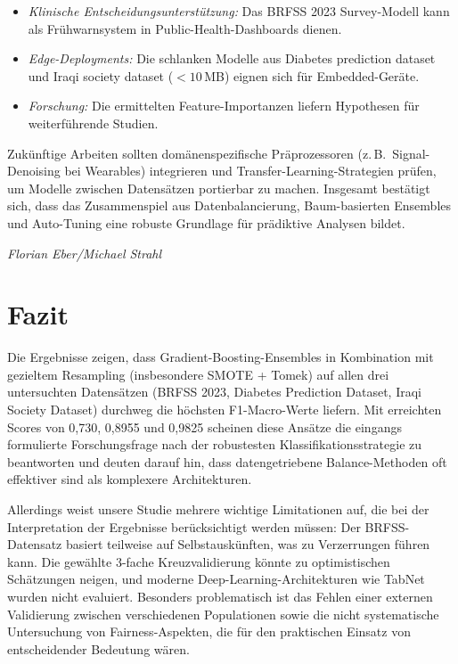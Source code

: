 \documentclass[10pt]{scrartcl}
\begin{document}
\begin{itemize}
  \item \emph{Klinische Entscheidungs­unterstützung:} Das BRFSS 2023 Survey-Modell kann als Frühwarnsystem in Public-Health-Dashboards dienen.
  \item \emph{Edge-Deployments:} Die schlanken Modelle aus Diabetes prediction dataset und Iraqi society dataset (\(<10\)\,MB) eignen sich für Embedded-Geräte.
  \item \emph{Forschung:} Die ermittelten Feature-Importanzen liefern Hypothesen für weiterführende Studien.
\end{itemize}

Zukünftige Arbeiten sollten domänenspezifische Präprozessoren (z.\,B.\ Signal-Denoising bei Wearables) integrieren und Transfer-Learning-Strategien prüfen, um Modelle zwischen Datensätzen portierbar zu machen. Insgesamt bestätigt sich, dass das Zusammenspiel aus Daten­balancierung, Baum-basierten Ensembles und Auto-Tuning eine robuste Grundlage für prädiktive Analysen bildet.

\begin{flushright}
  \footnotesize\textit{Florian Eber/Michael Strahl}
\end{flushright}





\section{Fazit}
\label{sec:conclusion}

Die Ergebnisse zeigen, dass Gradient-Boosting-Ensembles in Kombination mit gezieltem Resampling (insbesondere SMOTE + Tomek) auf allen drei untersuchten Datensätzen (BRFSS 2023, Diabetes Prediction Dataset, Iraqi Society Dataset) durchweg die höchsten F1-Macro-Werte liefern. Mit erreichten Scores von 0,730, 0,8955 und 0,9825 scheinen diese Ansätze die eingangs formulierte Forschungsfrage nach der robustesten Klassifikationsstrategie zu beantworten und deuten darauf hin, dass datengetriebene Balance-Methoden oft effektiver sind als komplexere Architekturen.

Allerdings weist unsere Studie mehrere wichtige Limitationen auf, die bei der Interpretation der Ergebnisse berücksichtigt werden müssen: Der BRFSS-Datensatz basiert teilweise auf Selbstauskünften, was zu Verzerrungen führen kann. Die gewählte 3-fache Kreuzvalidierung könnte zu optimistischen Schätzungen neigen, und moderne Deep-Learning-Architekturen wie TabNet wurden nicht evaluiert. Besonders problematisch ist das Fehlen einer externen Validierung zwischen verschiedenen Populationen sowie die nicht systematische Untersuchung von Fairness-Aspekten, die für den praktischen Einsatz von entscheidender Bedeutung wären.
\end{document}

